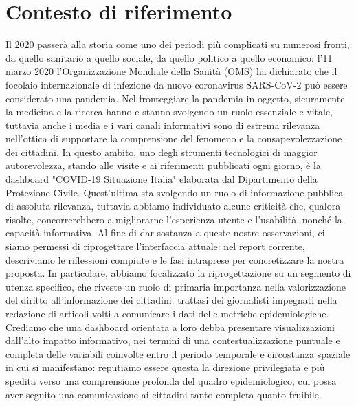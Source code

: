 \documentclass[../../main.tex]{subfiles}
\begin{document}
\section{Contesto di riferimento}
Il 2020 passerà alla storia come uno dei periodi più complicati su numerosi fronti, da quello sanitario a quello sociale, da quello politico a quello economico: l'11 marzo 2020 l'Organizzazione Mondiale della Sanità (OMS) ha dichiarato che il focolaio internazionale di infezione da nuovo coronavirus SARS-CoV-2 può essere considerato una pandemia.
Nel fronteggiare la pandemia in oggetto, sicuramente la medicina e la ricerca hanno e stanno svolgendo un ruolo essenziale e vitale, tuttavia anche i media e i vari canali informativi sono di estrema rilevanza nell'ottica di supportare la comprensione del fenomeno e la consapevolezzazione dei cittadini. In questo ambito, uno degli strumenti tecnologici di maggior autorevolezza, stando alle visite e ai riferimenti pubblicati ogni giorno, è la dashboard "COVID-19 Situazione Italia" elaborata dal Dipartimento della Protezione Civile. Quest'ultima sta svolgendo un ruolo di informazione pubblica di assoluta rilevanza, tuttavia abbiamo individuato alcune criticità che, qualora risolte, concorrerebbero a migliorarne l'esperienza utente e l'usabilità, nonché la capacità informativa.
Al fine di dar sostanza a queste nostre osservazioni, ci siamo permessi di riprogettare l'interfaccia attuale: nel report corrente, descriviamo le riflessioni compiute e le fasi intraprese per concretizzare la nostra proposta. In particolare, abbiamo focalizzato la riprogettazione su un segmento di utenza specifico, che riveste un ruolo di primaria importanza nella valorizzazione del diritto all'informazione dei cittadini: trattasi dei giornalisti impegnati nella redazione di articoli volti a comunicare i dati delle metriche epidemiologiche.
Crediamo che una dashboard orientata a loro debba presentare visualizzazioni dall'alto impatto informativo, nei termini di una contestualizzazione puntuale e completa delle variabili coinvolte entro il periodo temporale e circostanza spaziale in cui si manifestano: reputiamo essere questa la direzione privilegiata e più spedita verso una comprensione profonda del quadro epidemiologico, cui possa aver seguito una comunicazione ai cittadini tanto completa quanto fruibile.
\end{document}
